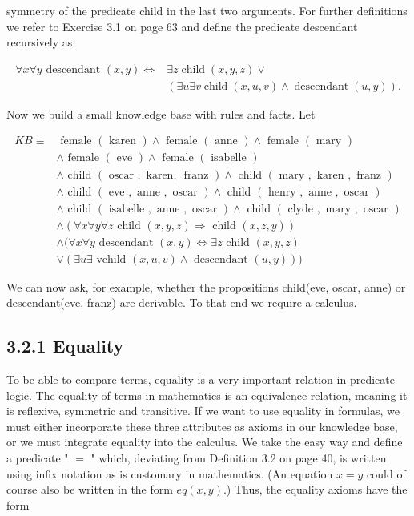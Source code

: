 \documentclass[10pt]{article}
\begin{document}
symmetry of the predicate child in the last two arguments. For further definitions we refer to Exercise 3.1 on page 63 and define the predicate descendant recursively as

$$
\begin{aligned}
\forall x \forall y \text { descendant }(x, y) \Leftrightarrow & \exists z \operatorname{child}(x, y, z) \vee \\
& (\exists u \exists v \operatorname{child}(x, u, v) \wedge \operatorname{descendant}(u, y)) .
\end{aligned}
$$

Now we build a small knowledge base with rules and facts. Let

$$
\begin{aligned}
K B \equiv & \text { female }(\text { karen }) \wedge \text { female }(\text { anne }) \wedge \text { female }(\text { mary }) \\
& \wedge \text { female }(\text { eve }) \wedge \text { female }(\text { isabelle }) \\
& \wedge \text { child }(\text { oscar }, \text { karen, } \text { franz }) \wedge \text { child }(\text { mary }, \text { karen }, \text { franz }) \\
& \wedge \text { child }(\text { eve }, \text { anne }, \text { oscar }) \wedge \text { child }(\text { henry }, \text { anne }, \text { oscar }) \\
& \wedge \text { child }(\text { isabelle }, \text { anne }, \text { oscar }) \wedge \text { child }(\text { clyde }, \text { mary }, \text { oscar }) \\
& \wedge(\forall x \forall y \forall z \text { child }(x, y, z) \Rightarrow \text { child }(x, z, y)) \\
& \wedge(\forall x \forall y \text { descendant }(x, y) \Leftrightarrow \exists z \text { child }(x, y, z) \\
& \vee(\exists u \exists \text { vchild }(x, u, v) \wedge \text { descendant }(u, y)))
\end{aligned}
$$

We can now ask, for example, whether the propositions child(eve, oscar, anne) or descendant(eve, franz) are derivable. To that end we require a calculus.

\subsection*{3.2.1 Equality}
To be able to compare terms, equality is a very important relation in predicate logic. The equality of terms in mathematics is an equivalence relation, meaning it is reflexive, symmetric and transitive. If we want to use equality in formulas, we must either incorporate these three attributes as axioms in our knowledge base, or we must integrate equality into the calculus. We take the easy way and define a predicate " $=$ " which, deviating from Definition 3.2 on page 40, is written using infix notation as is customary in mathematics. (An equation $x=y$ could of course also be written in the form $e q(x, y)$.) Thus, the equality axioms have the form
\end{document}
